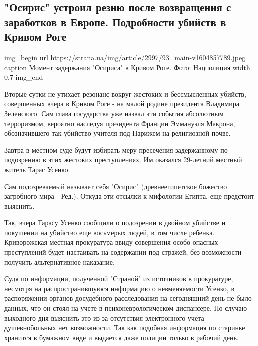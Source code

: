  
 
 

\subsection{"Осирис" устроил резню после возвращения с заработков в Европе. Подробности убийств в Кривом Роге}


\ifcmt
img_begin 
	url https://strana.ua/img/article/2997/93_main-v1604857789.jpeg
	caption Момент задержания "Осириса" в Кривом Роге. Фото: Нацполиция 
	width 0.7
img_end
\fi

Вторые сутки не утихает резонанс вокруг жестоких и бессмысленных убийств,
совершенных вчера в Кривом Роге - на малой родине президента Владимира
Зеленского. Сам глава государства уже назвал эти события абсолютным
терроризмом, вероятно наследуя президента Франции Эммануэля Макрона,
обозначившего так убийство учителя под Парижем на религиозной почве.

Завтра в местном суде будут избирать меру пресечения задержанному по подозрению
в этих жестоких преступлениях. Им оказался 29-летний местный житель Тарас
Усенко.

Сам подозреваемый называет себя "Осирис" (древнеегипетское божество загробного
мира - Ред.). Откуда эти отсылки к мифологии Египта, еще предстоит выяснить.

Так, вчера Тарасу Усенко сообщили о подозрении в двойном убийстве и покушении
на убийство еще восьмерых людей, в том числе ребенка. Криворожская местная
прокуратура ввиду совершения особо опасных преступлений  будет настаивать на
содержании под стражей, без возможности получить альтернативное наказание.

Судя по информации, полученной "Страной" из источников в прокуратуре, несмотря
на распространившуюся информацию о невменяемости Усенко, в распоряжении органов
досудебного расследования на сегодняшний день не было данных, что он стоял на
учете в психоневрологическом диспансере. По случаю выходного дня выяснить это
из-за отсутствия электронного учета душевнобольных нет возможности. Так как
подобная информация по старинке хранится в бумажном виде и выдается даже
полиции только в рабочий день.

